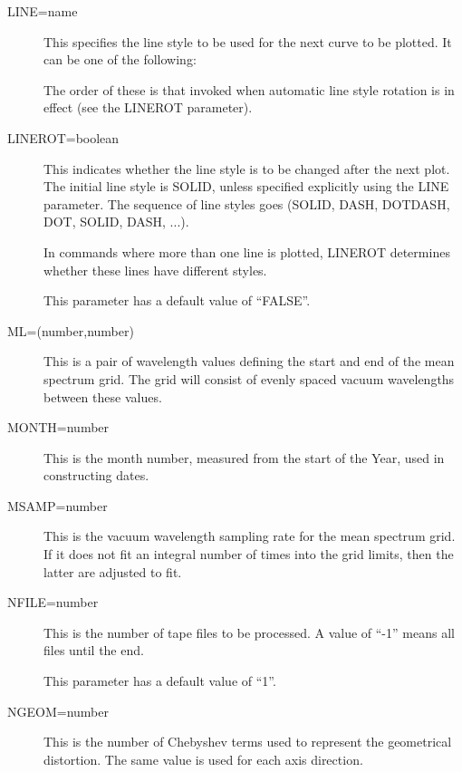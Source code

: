 \begin {description}
\item [LINE=name]
This specifies the line style to be used for the next curve to be
plotted.
It can be one of the following:

\begin {quote}
\end {quote}

The order of these is that invoked when automatic line style rotation
is in effect (see the LINEROT parameter).

\item [LINEROT=boolean]
This indicates whether the line style is to be changed after the
next plot.
The initial line style is SOLID, unless specified explicitly
using the LINE parameter.
The sequence of line styles goes (SOLID, DASH, DOTDASH, DOT, SOLID,
DASH, ...).

In commands where more than one line is plotted, LINEROT determines
whether these lines have different styles.

This parameter has a default value of ``FALSE''.

\item [ML=(number,number)]
This is a pair of wavelength values defining the start and end of
the mean spectrum grid.
The grid will consist of evenly spaced vacuum wavelengths between these
values.

\item [MONTH=number]
This is the month number, measured from the start of the Year,
used in constructing dates.

\item [MSAMP=number]
This is the vacuum wavelength sampling rate for the mean spectrum
grid.
If it does not fit an integral number of times into the grid limits,
then the latter are adjusted to fit.

\item [NFILE=number]
This is the number of tape files to be processed.
A value of ``-1'' means all files until the end.

This parameter has a default value of ``1''.

\item [NGEOM=number]
This is the number of Chebyshev terms used to represent the
geometrical distortion.
The same value is used for each axis direction.


\end{description}
